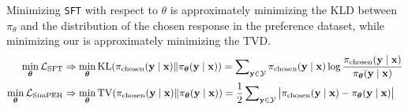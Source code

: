 \begin{theorem}\label{the:mutual}
Minimizing  \texttt{SFT}  with respect to ${\theta}$ is approximately minimizing the KLD between $\pi_\theta$ and the distribution of the chosen response in the preference dataset, while minimizing our \method  is approximately minimizing the TVD.
\begingroup\makeatletter\def\f@size{9.5}\check@mathfonts\def\maketag@@@#1{\hbox{\m@th\normalfont\normalfont#1}}
\begin{align}
\min_{\boldsymbol{\theta}} \mathcal{L}_{\rm{SFT}}&\Rightarrow  \min_{\boldsymbol{\theta}}{\mathrm{KL}}(\pi_{\rm{chosen}}(\mathbf{y}\mid\mathbf{x})\|  \pi_\mathbf{\boldsymbol{\theta}}(\mathbf{y} \mid \mathbf{x})  ) =\sum  \nolimits_{\mathbf{y}\in \mathcal{Y}} \pi_{\rm{chosen}}(\mathbf{y} \mid \mathbf{x})\log \frac{\pi_{\rm{chosen}}(\mathbf{y} \mid \mathbf{x})}{\pi_{\boldsymbol{\theta}}(\mathbf{y} \mid \mathbf{x})}\\
\min_{\boldsymbol{\theta}} \mathcal{L}_{\rm{SimPER}} &\Rightarrow  \min_{\mathbf{\boldsymbol{\theta}}}{\mathrm{TV}}(\pi_{\rm{chosen}}(\mathbf{y}\mid\mathbf{x})\|  \pi_\mathbf{\boldsymbol{\theta}}(\mathbf{y} \mid \mathbf{x})  ) =\frac{1}{2}\sum\nolimits_{\mathbf{y}\in \mathcal{Y}} \left| \pi_{\rm{chosen}}(\mathbf{y}\mid\mathbf{x}) -  \pi_{\boldsymbol{\theta}}(\mathbf{y} \mid \mathbf{x})  \right| 
\end{align}
\endgroup
\end{theorem}


